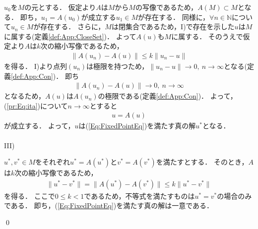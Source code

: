 \begin{Proof}[Banachの不動点定理]
$u_0$を$M$の元とする．
仮定より$A$は$M$から$M$の写像であるため，$A(M) \subset M$となる．
即ち，$u_1 = A(u_0)$が成立する$u_1 \in M$が存在する．
同様に，$\forall n \in {\mathbb N}$について$u_n \in M$が存在する．
さらに，$M$は閉集合であるため，I)で存在を示した$u$は$M$に属する(定義\ref{def:App:CloseSet})．
よって$A(u)$も$M$に属する．
そのうえで仮定より$A$は$k$次の縮小写像であるため，
\begin{align*}
\| A(u_n) - A(u) \| \le k \| u_n - u \|
\end{align*}
を得る．
I)より点列$(u_n)$は極限を持つため，$\| u_n - u \| \rightarrow 0, ~ n \rightarrow \infty$となる(定義\ref{def:App:Con})．
即ち
\begin{align*}
\| A(u_n) - A(u) \| \rightarrow 0, ~ n \rightarrow \infty
\end{align*}
となるため，$A(u)$は$A(u_n)$の極限である(定義\ref{def:App:Con})．
よって，(\ref{pr:Eq:ita})について$n \rightarrow \infty$とすると
\begin{align*}
u=A(u)
\end{align*}
が成立する．
よって，$u$は(\ref{Eq:FixedPointEq})を満たす真の解$u^*$となる．\\
\\
III)

$u^*,v^* \in M $をそれぞれ$u^* = A(u^*)$と$v^* = A(v^*)$を満たすとする．
そのとき，$A$は$k$次の縮小写像であるため，
\begin{align*}
\| u^* - v^* \| = \| A(u^*) -A(v^*) \| \le k\|u^* - v^*\|
\end{align*}
を得る．
ここで$0 \le k < 1$であるため，不等式を満たすものは$u^* = v^*$の場合のみである．
即ち，(\ref{Eq:FixedPointEq})を満たす真の解は一意である．

\qed
\end{Proof}

